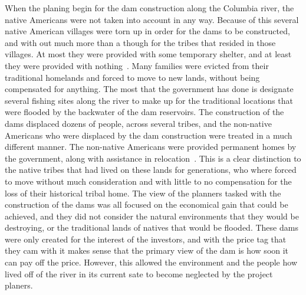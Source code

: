 \documentclass[12pt,twoside]{article}
\begin{document}
When the planing begin for the dam construction along the Columbia river, the
native Americans were not taken into account in any way. Because of this
several native American villages were torn up in order for the dams to be
constructed, and with out much more than a though for the tribes that resided
in those villages. At most they were provided with some temporary shelter, and
at least they were provided with nothing~\cite{ST}. Many families were evicted
from their traditional homelands and forced to move to new lands, without being
compensated for anything. The most that the government has done is designate
several fishing sites along the river to make up for the traditional locations
that were flooded by the backwater of the dam reservoirs. The construction of
the dams displaced dozens of people, across several tribes, and the non-native
Americans who were displaced by the dam construction were treated in a much
different manner. The non-native Americans were provided permanent homes by the
government, along with assistance in relocation~\cite{ST}. This is a clear
distinction to the native tribes that had lived on these lands for generations,
who where forced to move without much consideration and with little to no
compensation for the loss of their historical tribal home. The view of the
planners tasked with the construction of the dams was all focused on the
economical gain that could be achieved, and they did not consider the natural
environments that they would be destroying, or the traditional lands of natives
that would be flooded. These dams were only created for the interest of the
investors, and with the price tag that they cam with it makes sense that the
primary view of the dam is how soon it can pay off the price. However, this
allowed the environment and the people how lived off of the river in its
current sate to become neglected by the project planers. 
\end{document}
